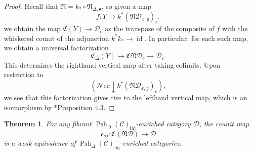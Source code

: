\documentclass[a4paper]{article}
\numberwithin{equation}{subsection}
\theoremstyle{plain}   %
\newtheorem{thm}[equation]{Theorem}
\theoremstyle{definition}
\theoremstyle{remark}
\theoremstyle{plain}
\DeclareMathOperator{\id}{id}
\newcommand{\Nec}{\ensuremath{{\mathcal{N}ec}}}
\newcommand{\overcat}[2]{{\left(#1\downarrow #2\right)}}
\newcommand{\spsh}{\ensuremath{\operatorname{Psh}_\Delta(\mathcal{C})}}
\begin{document}
\begin{proof}
Recall that \(\mathfrak{N}=k_\ast \circ \mathfrak{N}_{\Delta,\bullet}\), so given a map \[f:Y\to k^\ast(\mathfrak{N}\mathcal{D}_{x,y})_c,\] we obtain the map \(\mathfrak{C}(Y)\to \mathcal{D}_c\) as the transpose of the composite of \(f\) with the whiskered counit of the adjunction \(k^\ast k_\ast \to \id\).   In particular, for each such map, we obtain a universal factorization \[\mathfrak{C}_\Delta(Y) \to \mathfrak{C}\mathfrak{N}\mathcal{D}_c\to \mathcal{D}_c.\] This determines the righthand vertical map after taking colimits.
Upon restriction to \[\overcat{\Nec}{k^\ast(\mathfrak{N}\mathcal{D}_{x,y})_c},\] we see that this factorization gives rise to the lefthand vertical map, which is an isomorphism by \cite{ds1}*{Proposition 4.3}.  
\end{proof}
\begin{thm}\label{counitthm}
  For any fibrant \(\spsh_{\mathrm{inj}}\)-enriched category \(\mathcal{D}\), the counit map
	\[\epsilon_\mathcal{D}:\mathfrak{C}(\mathfrak{N}\mathcal{D})\to \mathcal{D}\]
	is a weak equivalence of \(\spsh_{\mathrm{inj}}\)-enriched categories.
\end{thm}
\end{document}
